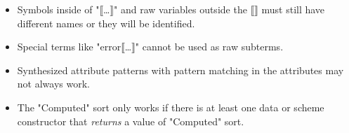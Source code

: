 \documentclass[11pt]{article} %
\begin{document}
\begin{itemize}
\item Symbols inside of "⟦…⟧" and raw variables outside the ⟦⟧ must still have different names or
  they will be identified.

\item Special terms like "error⟦…⟧" cannot be used as raw subterms.

\item Synthesized attribute patterns with pattern matching in the attributes may not always work.

\item The "Computed" sort only works if there is at least one data or scheme constructor that
  \emph{returns} a value of "Computed" sort.

\end{itemize}



\end{document}
